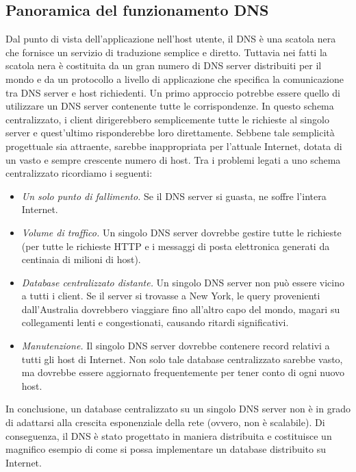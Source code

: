 \subsection{Panoramica del funzionamento DNS}
Dal punto di vista dell'applicazione nell'host utente, il DNS è una scatola nera che fornisce un servizio di traduzione semplice e diretto. Tuttavia nei fatti la scatola nera è costituita da un gran numero di DNS server distribuiti per il mondo e da un protocollo a livello di applicazione che specifica la comunicazione tra DNS server e host richiedenti.
Un primo approccio potrebbe essere quello di utilizzare un DNS server contenente tutte le corrispondenze. In questo schema centralizzato, i client dirigerebbero semplicemente tutte le richieste al singolo server e quest'ultimo risponderebbe loro direttamente. Sebbene tale semplicità progettuale sia attraente, sarebbe inappropriata per l'attuale Internet, dotata di un vasto e sempre crescente numero di host. 
Tra i problemi legati a uno schema centralizzato ricordiamo i seguenti:
\begin{itemize}
    \item \textit{Un solo punto di fallimento.} Se il DNS server si guasta, ne soffre l'intera Internet.
    \item \textit{Volume di traffico.} Un singolo DNS server dovrebbe gestire tutte le richieste (per tutte le richieste HTTP e i messaggi di posta elettronica generati da centinaia di milioni di host).
    \item \textit{Database centralizzato distante.} Un singolo DNS server non può essere vicino a tutti i client. Se il server si trovasse a New York, le query provenienti dall'Australia dovrebbero viaggiare fino all'altro capo del mondo, magari su collegamenti lenti e congestionati, causando ritardi significativi.
    \item \textit{Manutenzione.} Il singolo DNS server dovrebbe contenere record relativi a tutti gli host di Internet. Non solo tale database centralizzato sarebbe vasto, ma dovrebbe essere aggiornato frequentemente per tener conto di ogni nuovo host.
\end{itemize}

In conclusione, un database centralizzato su un singolo DNS server non è in grado
di adattarsi alla crescita esponenziale della rete (ovvero, non è scalabile). Di conseguenza, il DNS è stato progettato in maniera distribuita e costituisce un magnifico
esempio di come si possa implementare un database distribuito su Internet.

